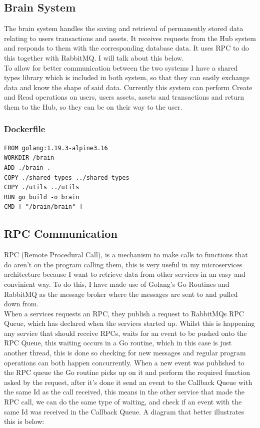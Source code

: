 \documentclass[titlepage]{article}
\begin{document}
\subsection{Brain System}
The brain system handles the saving and retrieval of permanently stored data relating to users transactions and assets. It receives requests from the Hub system and responds to them with the corresponding database data. It uses RPC to do this together with RabbitMQ. I will talk about this below. \\

To allow for better communication between the two systems I have a shared types library which is included in both system, so that they can easily exchange data and know the shape of said data. Currently this system can perform Create and Read operations on users, users assets, assets and transactions and return them to the Hub, so they can be on their way to the user.

\subsubsection{Dockerfile}
\begin{verbatim}
FROM golang:1.19.3-alpine3.16
WORKDIR /brain
ADD ./brain .
COPY ./shared-types ../shared-types
COPY ./utils ../utils
RUN go build -o brain
CMD [ "/brain/brain" ]
\end{verbatim}

\subsection{RPC Communication}
RPC (Remote Procedural Call), is a mechanism to make calls to functions that do aren't on the program calling them, this is very useful in my microservices architecture because I want to retrieve data from other services in an easy and convinient way. To do this, I have made use of Golang's Go Routines and RabbitMQ as the message broker where the messages are sent to and pulled down from. \\

When a services requests an RPC, they publish a request to RabbitMQs RPC Queue, which has declared when the services started up. Whilst this is happening any service that should receive RPCs, waits for an event to be pushed onto the RPC Queue, this waiting occurs in a Go routine, which in this case is just another thread, this is done so checking for new messages and regular program operations can both happen concurrently. When a new event was published to the RPC queue the Go routine picks up on it and perform the required function asked by the request, after it's done it send an event to the Callback Queue with the same Id as the call received, this means in the other service that made the RPC call, we can do the same type of waiting, and check if an event with the same Id was received in the Callback Queue. A diagram that better illustrates this is below:
\end{document}
